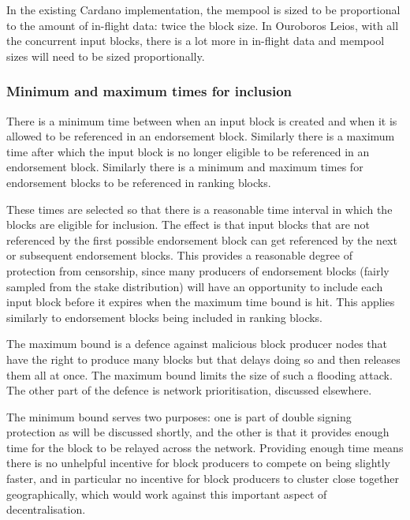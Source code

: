 \documentclass[11pt,a4paper]{article}
\begin{document}
In the existing Cardano implementation, the mempool is sized to be proportional
to the amount of in-flight data: twice the block size. In Ouroboros Leios, with
all the concurrent input blocks, there is a lot more in in-flight data and
mempool sizes will need to be sized proportionally.

\subsubsection{Minimum and maximum times for inclusion}
There is a minimum time
between when an input block is created and when it is allowed to be referenced
in an endorsement block. Similarly there is a maximum time after which the
input block is no longer eligible to be referenced in an endorsement block.
Similarly there is a minimum and maximum times for endorsement blocks to be
referenced in ranking blocks.

These times are selected so that there is a reasonable time interval in which
the blocks are eligible for inclusion. The effect is that input blocks that are
not referenced by the first possible endorsement block can get referenced by
the next or subsequent endorsement blocks. This provides a reasonable degree of
protection from censorship, since many producers of endorsement blocks (fairly
sampled from the stake distribution) will have an opportunity to include each
input block before it expires when the maximum time bound is hit. This applies
similarly to endorsement blocks being included in ranking blocks.

The maximum bound is a defence against malicious block producer nodes that have
the right to produce many blocks but that delays doing so and then releases
them all at once. The maximum bound limits the size of such a flooding attack.
The other part of the defence is network prioritisation, discussed elsewhere.

The minimum bound serves two purposes: one is part of double signing protection
as will be discussed shortly, and the other is that it provides enough time for
the block to be relayed across the network. Providing enough time means there
is no unhelpful incentive for block producers to compete on being slightly
faster, and in particular no incentive for block producers to cluster close
together geographically, which would work against this important aspect of
decentralisation.
\end{document}
